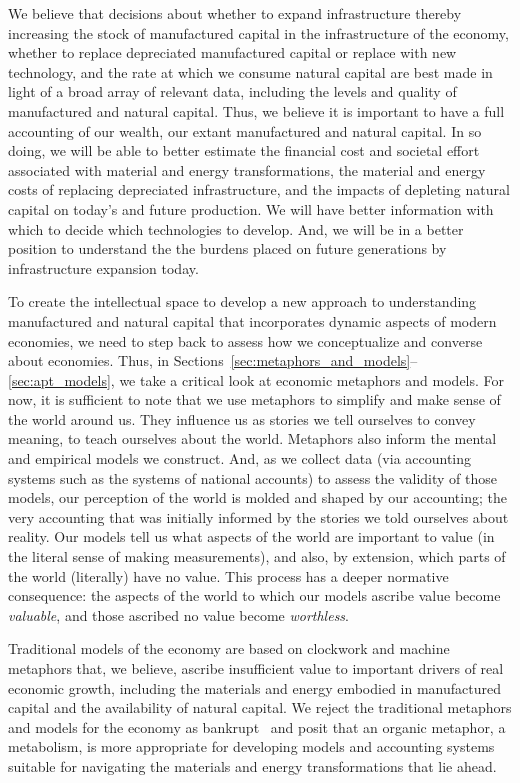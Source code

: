 We believe that decisions about 
whether to expand infrastructure 
	thereby increasing the stock 
	of manufactured capital 
	in the infrastructure of the economy, 
whether to replace depreciated manufactured capital 
	or replace with new technology, and
the rate at which we consume natural capital
are best made in light of a broad array of relevant data, 
including the levels and quality of manufactured and natural capital.
Thus, we believe it is important to have a full accounting of our wealth, 
our extant manufactured and natural capital.
In so doing, 
we will be able to better estimate 
the financial cost and societal effort 
	associated with material and energy transformations,
the material and energy costs 
	of replacing depreciated infrastructure, and
the impacts of depleting natural capital 
	on today's and future production.
We will have better information 
	with which to decide which technologies to develop.
And, we will be in a better position to
	understand the the burdens placed on future generations
	by infrastructure expansion today.

\vspace{10 mm}

To create the intellectual space to 
develop a new approach to understanding manufactured and natural capital
that incorporates dynamic aspects of modern economies,
we need to step back to assess how we conceptualize and converse about economies.
Thus, in Sections~\ref{sec:metaphors_and_models}--\ref{sec:apt_models}, 
we take a critical look at economic metaphors and models.
For now, it is sufficient to note that 
we use metaphors to simplify and make sense of the world around us.
They influence us as stories we tell ourselves to convey meaning,
to teach ourselves about the world.
Metaphors also inform 
the mental and empirical models we construct.
And, as we collect data 
(via accounting systems such as the systems of national accounts) 
to assess the validity of those models,
our perception of the world is molded and shaped
by our accounting;
the very accounting that was initially informed
by the stories we told ourselves about reality.
Our models tell us what aspects of the world
are important to value 
(in the literal sense of making measurements),
and also, by extension, 
which parts of the world (literally) have no value.
This process has a deeper normative consequence: 
the aspects of the world to which our models ascribe
value become \emph{valuable},
and those ascribed no value become \emph{worthless}.

Traditional models of the economy
are based on clockwork and machine metaphors that, we believe, ascribe insufficient value 
to important drivers of real economic growth, including 
the materials and energy embodied in manufactured capital and 
the availability of natural capital.
We reject the traditional metaphors and models 
for the economy as bankrupt~\cite{Liu2012}
and posit that an organic metaphor, a metabolism, 
is more appropriate for developing models and accounting systems
suitable for navigating the materials and energy transformations 
that lie ahead.

